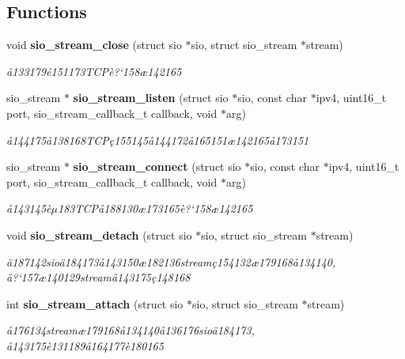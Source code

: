 \subsection*{Functions}
\begin{CompactItemize}
\item 
void {\bf sio\_\-stream\_\-close} (struct sio $\ast$sio, struct sio\_\-stream $\ast$stream)
\begin{CompactList}\small\item\em \aa{}133179\'{e}151173TCP\`{e}?`158\ae{}142165 \item\end{CompactList}\item 
sio\_\-stream $\ast$ {\bf sio\_\-stream\_\-listen} (struct sio $\ast$sio, const char $\ast$ipv4, uint16\_\-t port, sio\_\-stream\_\-callback\_\-t callback, void $\ast$arg)
\begin{CompactList}\small\item\em \aa{}144175\aa{}138168TCP\c{c}155145\aa{}144172\aa{}165151\ae{}142165\aa{}173151 \item\end{CompactList}\item 
sio\_\-stream $\ast$ {\bf sio\_\-stream\_\-connect} (struct sio $\ast$sio, const char $\ast$ipv4, uint16\_\-t port, sio\_\-stream\_\-callback\_\-t callback, void $\ast$arg)
\begin{CompactList}\small\item\em \aa{}143145\`{e}$\mu$183TCP\aa{}188130\ae{}173165\`{e}?`158\ae{}142165 \item\end{CompactList}\item 
void {\bf sio\_\-stream\_\-detach} (struct sio $\ast$sio, struct sio\_\-stream $\ast$stream)
\begin{CompactList}\small\item\em \"{a}187142sio\"{a}184173\aa{}143150\ae{}182136stream\c{c}154132\ae{}179168\aa{}134140, \"{a}?`157\ae{}140129stream\aa{}143175\c{c}148168 \item\end{CompactList}\item 
int {\bf sio\_\-stream\_\-attach} (struct sio $\ast$sio, struct sio\_\-stream $\ast$stream)
\begin{CompactList}\small\item\em \aa{}176134stream\ae{}179168\aa{}134140\aa{}136176sio\"{a}184173, \aa{}143175\`{e}131189\aa{}164177\`{e}180165 \item\end{CompactList}\item 

\end{CompactItemize}

